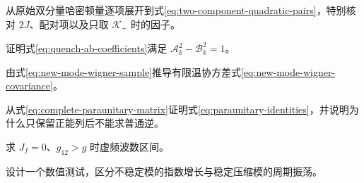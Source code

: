 \begin{exercises}
  \item 从原始双分量哈密顿量逐项展开到式\eqref{eq:two-component-quadratic-pairs}，特别核对 $2J$、配对项以及只取 $\mathcal K_+$ 时的因子。
  \item 证明式\eqref{eq:quench-ab-coefficients}满足 $\mathcal A_k^2-\mathcal B_k^2=1$。
  \item 由式\eqref{eq:new-mode-wigner-sample}推导有限温协方差式\eqref{eq:new-mode-wigner-covariance}。
  \item 从式\eqref{eq:complete-paraunitary-matrix}证明式\eqref{eq:paraunitary-identities}，并说明为什么只保留正能列后不能求普通逆。
  \item 求 $J_f=0$、$g_{12}>g$ 时虚频波数区间。
  \item 设计一个数值测试，区分不稳定模的指数增长与稳定压缩模的周期振荡。
\end{exercises}

